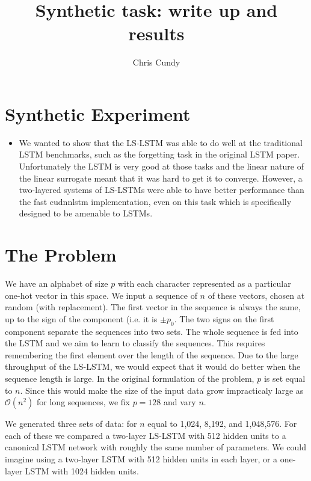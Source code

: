 \documentclass[letterpaper, 10 pt]{article}
\title{Synthetic task: write up and results}
\author{Chris Cundy}
\begin{document}
\maketitle

\maketitle

\section{Synthetic Experiment}

\begin{itemize}
\item{We wanted to show that the LS-LSTM was able to do well at the traditional
    LSTM benchmarks, such as the forgetting task in the original LSTM
    paper. Unfortunately the LSTM is very good at those tasks and the linear nature
    of the linear surrogate meant that it was hard to get it to converge. However, a
    two-layered systems of LS-LSTMs were able to have better performance than the
    fast cudnnlstm implementation, even on this task which is specifically designed
    to be amenable to LSTMs.}
\end{itemize}

\section{The Problem}
We have an alphabet of size \(p\) with each character represented as a
particular one-hot vector in this space. We input a sequence of \(n\) of these
vectors, chosen at random (with replacement). The first vector in the sequence
is always the same, up to the sign of the component (i.e. it is \(\pm p_0
\). The two signs on the first component separate the sequences into two
sets. The whole sequence is fed into the LSTM and we aim to learn to classify
the sequences. This requires remembering the first element over the length of the
sequence. Due to the large throughput of the LS-LSTM, we would expect that it
would do better when the sequence length is large. In the original formulation
of the problem, \(p\) is set equal to \(n\). Since this would make the size of the
input data grow impracticaly large as \(\mathcal{O}(n^2)\) for long sequences, we
fix \(p = 128\) and vary \(n\).


We generated three sets of data: for \(n\) equal to 1,024, 8,192, and
1,048,576. For each of these we compared a two-layer LS-LSTM with 512 hidden
units to a canonical LSTM network with roughly the same number of
parameters. We could imagine using a two-layer LSTM with 512 hidden units in
each layer, or a one-layer LSTM with 1024 hidden units.
\end{document}
